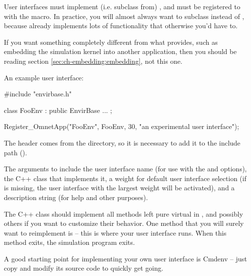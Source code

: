 User interfaces must implement (i.e. subclass from) ,
and must be registered to {\opp} with the  macro.
In practice, you will almost always want to subclass 
instead of , because  already
implements lots of functionality that otherwise you'd have to.

\begin{note}
If you want something completely different from what 
provides, such as embedding the simulation kernel into another
application, then you should be reading section \ref{sec:ch-embedding:embedding},
not this one.
\end{note}

An example user interface:

\begin{cpp}
#include "envirbase.h"

class FooEnv : public EnvirBase
{
    ...
};

Register_OmnetApp("FooEnv", FooEnv, 30, "an experimental user interface");
\end{cpp}

The  header comes from the  directory,
so it is necessary to add it to the include path ().

The arguments to  include the user interface name
(for use with the  and  options),
the C++ class that implements it, a weight for default user interface selection
(if  is missing, the user interface with the largest weight will be
activated), and a description string (for help and other purposes).

The C++ class should implement all methods left pure virtual in
, and possibly others if you want to customize
their behavior. One method that you will surely want to reimplement is
 -- this is where your user interface runs. When this method
exits, the simulation program exits.

\begin{note}
A good starting point for implementing your own user interface is
Cmdenv -- just copy and modify its source code to quickly get going.
\end{note}



